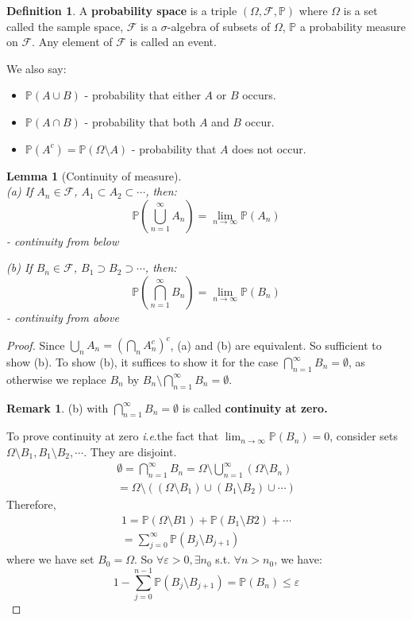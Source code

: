 \documentclass{article}
\numberwithin{equation}{section}
\newtheorem{lemma}[theorem]{Lemma}
\theoremstyle{definition}
\newtheorem{definition}{Definition}[section]
\newtheorem{remark}{Remark}[theorem]
\newcommand{\pr}{\mathbb{P}}
\newcommand{\mc}[1]{\mathcal{#1}}
\newcommand{\pspace}{(\Omega, \mathcal{F}, \mathbb{P})}
\newcommand{\sm}{\setminus}
\newcommand{\ie}{\textit{i}.\textit{e}.}
\begin{document}
\begin{definition}
    A \textbf{probability space} is a triple $\pspace$ where $\Omega$ is a set called the sample space, $\mc{F}$ is a $\sigma$-algebra of subsets of $\Omega$, $\pr$ a probability measure on $\mc{F}$. Any element of $\mc{F}$ is called an event.
\end{definition}
We also say:
\begin{itemize}
    \item $\pr(A \cup B)$ - probability that either $A$ or $B$ occurs.
    \item $\pr(A \cap B)$ - probability that both $A$ and $B$ occur.
    \item $\pr(A^c) = \pr(\Omega \sm A)$ - probability that $A$ does not occur.
\end{itemize}
\begin{lemma}[Continuity of measure]
    \label{le:1} \phantom{123123} \\
    (a) If $A_n \in \mc{F}$, $A_1 \subset A_2 \subset \cdots$, then:
    \begin{equation}
        \pr (\bigcup_{n=1}^\infty A_n) = \lim_{n\rightarrow\infty}\pr(A_n)
    \end{equation} - continuity from below

    
    (b) If $B_n \in \mc{F}$, $B_1 \supset B_2 \supset \cdots$, then:
    \begin{equation}
        \pr (\bigcap_{n=1}^\infty B_n) = \lim_{n\rightarrow\infty}\pr(B_n)
    \end{equation} - continuity from above
\end{lemma}
\begin{proof}
    Since $\bigcup_{n} A_n = \left(\bigcap_n A_n^c\right)^c$, (a) and (b) are equivalent.
    So sufficient to show (b). To show (b), it suffices to show it for the case $\bigcap_{n=1}^\infty B_n = \emptyset$, as otherwise we replace $B_n$ by $B_n \sm \bigcap_{n=1}^\infty B_n = \emptyset$.
    \begin{remark}
        (b) with $\bigcap_{n=1}^\infty B_n = \emptyset$ is called \textbf{continuity at zero.}
    \end{remark}
    To prove continuity at zero \ie the fact that $\lim_{n\rightarrow\infty} \pr(B_n) = 0$, consider sets $\Omega \sm B_1, B_1\sm B_2,\cdots$. They are disjoint.
    \begin{align}
        \emptyset = \bigcap_{n=1}^\infty B_n = \Omega \sm \bigcup_{n=1}^\infty (\Omega \sm B_n) \\
        = \Omega \sm \left((\Omega \sm B_1) \cup (B_1 \sm B_2) \cup \cdots\right)
    \end{align}
    Therefore,
    \begin{align}
        1 = \pr(\Omega \sm B1) + \pr(B_1 \sm B2) + \cdots \\
        = \sum_{j=0}^\infty \pr(B_j \sm B_{j+1})
    \end{align}
    where we have set $B_0 = \Omega$.
    So $\forall \varepsilon > 0, \exists n_0$ s.t. $\forall n>n_0$, we have:
    \begin{equation}
        1 - \sum_{j=0}^{n-1} \pr(B_j \setminus B_{j+1}) = \pr(B_n) \le \varepsilon
    \end{equation}
\end{proof}
\end{document}
